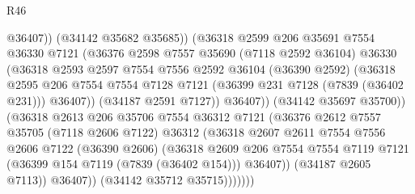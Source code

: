 \begin{lexlean}{R46}
\begin{coremodule}
                                @36407))
                            (@34142 @35682 @35685))
                          (@36318
                            @2599
                            @206
                            @35691
                            @7554
                            @36330
                            @7121
                            (@36376
                              @2598
                              @7557
                              @35690
                              (@7118 @2592 @36104)
                              @36330
                              (@36318
                                @2593
                                @2597
                                @7554
                                @7556
                                @2592
                                @36104
                                (@36390 @2592)
                                (@36318
                                  @2595
                                  @206
                                  @7554
                                  @7554
                                  @7128
                                  @7121
                                  (@36399 @231 @7128 (@7839 (@36402 @231)))
                                  @36407))
                              (@34187 @2591 @7127))
                            @36407))
                        (@34142 @35697 @35700))
                      (@36318
                        @2613
                        @206
                        @35706
                        @7554
                        @36312
                        @7121
                        (@36376
                          @2612
                          @7557
                          @35705
                          (@7118 @2606 @7122)
                          @36312
                          (@36318
                            @2607
                            @2611
                            @7554
                            @7556
                            @2606
                            @7122
                            (@36390 @2606)
                            (@36318
                              @2609
                              @206
                              @7554
                              @7554
                              @7119
                              @7121
                              (@36399 @154 @7119 (@7839 (@36402 @154)))
                              @36407))
                          (@34187 @2605 @7113))
                        @36407))
                    (@34142 @35712 @35715)))))))

\end{coremodule}
\end{lexlean}
